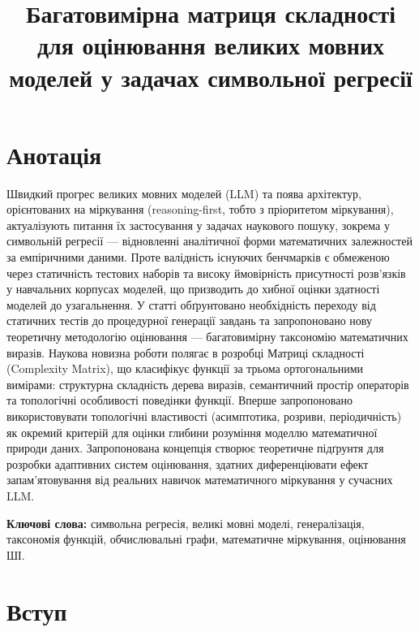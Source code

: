 \documentclass[11pt]{article}
\title{Багатовимірна матриця складності для оцінювання великих мовних моделей у задачах символьної регресії}
\author{}
\date{}
\begin{document}
\maketitle

\section*{Анотація}

Швидкий прогрес великих мовних моделей (LLM) та поява архітектур, орієнтованих на міркування (reasoning-first, тобто з пріоритетом міркування), актуалізують питання їх застосування у задачах наукового пошуку, зокрема у символьній регресії --- відновленні аналітичної форми математичних залежностей за емпіричними даними. Проте валідність існуючих бенчмарків є обмеженою через статичність тестових наборів та високу ймовірність присутності розв'язків у навчальних корпусах моделей, що призводить до хибної оцінки здатності моделей до узагальнення. У статті обґрунтовано необхідність переходу від статичних тестів до процедурної генерації завдань та запропоновано нову теоретичну методологію оцінювання --- багатовимірну таксономію математичних виразів. Наукова новизна роботи полягає в розробці Матриці складності (Complexity Matrix), що класифікує функції за трьома ортогональними вимірами: структурна складність дерева виразів, семантичний простір операторів та топологічні особливості поведінки функції. Вперше запропоновано використовувати топологічні властивості (асимптотика, розриви, періодичність) як окремий критерій для оцінки глибини розуміння моделлю математичної природи даних. Запропонована концепція створює теоретичне підґрунтя для розробки адаптивних систем оцінювання, здатних диференціювати ефект запам'ятовування від реальних навичок математичного міркування у сучасних LLM.

\textbf{Ключові слова:} символьна регресія, великі мовні моделі, генералізація, таксономія функцій, обчислювальні графи, математичне міркування, оцінювання ШІ.

\section*{Вступ}
\end{document}

